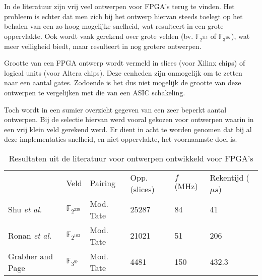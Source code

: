 In de literatuur zijn vrij veel ontwerpen voor FPGA's terug te vinden. Het probleem is echter dat men zich bij het ontwerp hiervan steeds toelegt op het behalen van een zo hoog mogelijke snelheid, wat resulteert in een grote oppervlakte. Ook wordt vaak gerekend over grote velden (bv. $\mathbb{F}_{2^{313}}$ of $\mathbb{F}_{3^{197}}$), wat meer veiligheid biedt, maar resulteert in nog grotere ontwerpen.

Grootte van een FPGA ontwerp wordt vermeld in slices (voor Xilinx chips) of logical units (voor Altera chips). Deze eenheden zijn onmogelijk om te zetten naar een aantal gates. Zodoende is het dus niet mogelijk de grootte van deze ontwerpen te vergelijken met die van een ASIC schakeling.

Toch wordt in  een sumier overzicht gegeven van een zeer beperkt aantal ontwerpen. Bij de selectie hiervan werd vooral gekozen voor ontwerpen waarin in een vrij klein veld gerekend werd. Er dient in acht te worden genomen dat bij al deze implementaties snelheid, en niet oppervlakte, het voornaamste doel is.

\begin{table}[h]
	\caption{Resultaten uit de literatuur voor ontwerpen ontwikkeld voor FPGA's}
	\label{tabel-resultaten-fpga}

	\centering
	\begin{tabular}{|l||l|l|l|l|l|}
		\hline
		&	Veld	& Pairing	& Opp. (slices)	& $f$ (MHz)	& Rekentijd ($\mu s$)\\
		Shu \emph{et al.} \cite{shu}		& $\mathbb{F}_{2^{239}}$	& Mod. Tate	& 25287	& 84	& 41\\
		Ronan \emph{et al.} \cite{ronan}	& $\mathbb{F}_{2^{103}}$	& Mod. Tate	& 21021	& 51	& 206\\
		Grabher and Page \cite{grabher}	& $\mathbb{F}_{3^{97}}$		& Mod. Tate	& 4481	& 150	& 432.3\\
		\hline
	\end{tabular}
\end{table}
